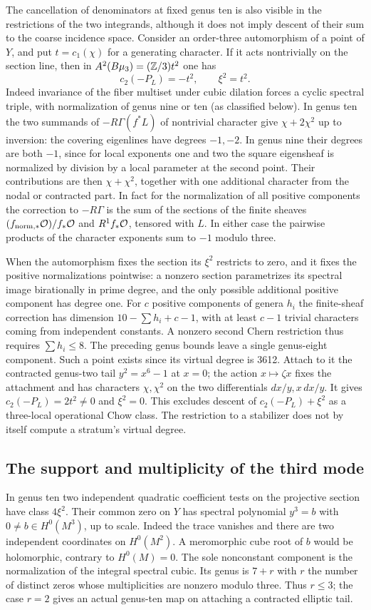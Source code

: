 The cancellation of denominators at fixed genus ten is also visible
in the restrictions of the two integrands, although it does not imply
descent of their sum to the coarse incidence space. Consider an
order-three automorphism of a point of $Y$, and put $t=c_1(\chi)$ for
a generating character. If it acts nontrivially on the section line,
then in $A^2(B\mu_3)=(\mathbb Z/3)t^2$ one has
\[
 c_2(-P_L)=-t^2,\qquad \xi^2=t^2.
\]
Indeed invariance of the fiber multiset under cubic dilation forces a
cyclic spectral triple, with normalization of genus nine or ten (as
classified below). In genus ten the two summands of
$-R\Gamma(f^*L)$ of nontrivial character give $\chi+2\chi^2$ up
to inversion: the covering eigenlines have degrees $-1,-2$.
In genus nine their degrees are both $-1$, since for local exponents
one and two the square eigensheaf is normalized by division by
a local parameter at the second point. Their contributions are then
$\chi+\chi^2$, together with one additional character from the nodal
or contracted part. In fact for the normalization of all positive
components the correction to $-R\Gamma$ is the sum of the sections
of the finite sheaves $(f_{\rm norm,*}\mathcal O)/f_*\mathcal O$ and
$R^1 f_*\mathcal O$, tensored with $L$. In either case the pairwise products
of the character exponents sum to $-1$ modulo three.

When the automorphism fixes the section its $\xi^2$ restricts to
zero, and it fixes the positive normalizations pointwise: a nonzero
section parametrizes its spectral image birationally in prime degree,
and the only possible additional positive component has degree one.
For $c$ positive components of genera $h_i$ the finite-sheaf
correction has dimension $10-\sum h_i+c-1$, with at least $c-1$
trivial characters coming from independent constants. A nonzero second
Chern restriction thus requires $\sum h_i\le8$. The preceding
genus bounds leave a single genus-eight component. Such a point
exists since its virtual degree is 3612. Attach to it the contracted
genus-two tail $y^2=x^6-1$ at $x=0$; the action $x\mapsto\zeta x$
fixes the attachment and has characters $\chi,\chi^2$ on the two
differentials $dx/y,x\,dx/y$. It gives
$c_2(-P_L)=2t^2\ne0$ and $\xi^2=0$. This excludes descent of
$c_2(-P_L)+\xi^2$ as a three-local operational Chow class. The
restriction to a stabilizer does not by itself compute a stratum's
virtual degree.

\subsection{The support and multiplicity of the third mode}
In genus ten two independent quadratic coefficient tests on the
projective section have class $4\xi^2$. Their common zero on $Y$
has spectral polynomial $y^3=b$ with $0\ne b\in H^0(M^3)$, up to
scale. Indeed the trace vanishes and there are two independent
coordinates on $H^0(M^2)$. A meromorphic cube root of $b$ would be
holomorphic, contrary to $H^0(M)=0$. The sole nonconstant component
is the normalization of the integral spectral cubic. Its genus is
$7+r$ with $r$ the number of distinct zeros whose multiplicities
are nonzero modulo three. Thus $r\le3$; the case $r=2$ gives an
actual genus-ten map on attaching a contracted elliptic tail.


